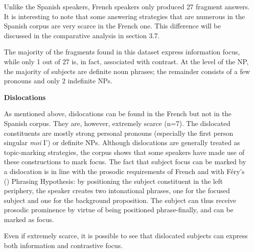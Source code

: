 Unlike the Spanish speakers, French speakers only produced 27 fragment answers. It is interesting to note that some answering strategies that are numerous in the Spanish corpus are very scarce in the French one. This difference will be discussed in the comparative analysis in section 3.7.

The majority of the fragments found in this dataset express information focus, while only 1 out of 27 is, in fact, associated with contrast. At the level of the NP, the majority of subjects are definite noun phrases; the remainder consists of a few pronouns and only 2 indefinite NPs.

\textbf{Dislocations}

As mentioned above, dislocations can be found in the French but not in the Spanish corpus. They are, however, extremely scarce (n=7). The  dislocated constituents are mostly strong personal pronouns (especially the first person singular \textit{moi} I') or definite NPs. Although dislocations are generally treated as topic-marking strategies, the corpus shows that some speakers have made use of these constructions to mark focus. The fact that subject focus can be marked by a dislocation is in line with the prosodic requirements of French and with Féry's (\citeyear{fery2001focus}) Phrasing Hypothesis: by positioning the subject constituent in the left periphery, the speaker creates two intonational phrases, one for the focused subject and one for the background proposition. The subject can thus receive prosodic prominence by virtue of being positioned phrase-finally, and can be marked as focus.

Even if extremely scarce, it is possible to see that dislocated subjects can express both information and contrastive focus.

